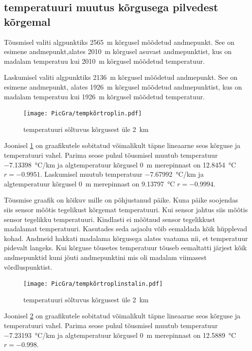 \documentclass{trkut}%
\begin{document}
\subsection{temperatuuri muutus kõrgusega pilvedest kõrgemal}
Tõusmisel valiti algpunktiks \SI{2565}{m} kõrgusel mõõdetud andmepunkt. See on esimene andmepunkt,alates \SI{2010}{m} kõrgusel asuvast andmepunktist, kus on madalam temperatuu kui \SI{2010}{m} kõrgusel mõõdetud temperatuur.

Laskumisel valiti algpunktiks \SI{2136}{m} kõrgusel mõõdetud andmepunkt. See on esimene andmepunkt, alates \SI{1926}{m} kõrgusel mõõdetud andmepunktist, kus on madalam temperatuu kui \SI{1926}{m} kõrgusel mõõdetud temperatuur.

\begin{figure}[h]
	\texttt{[image: PicGra/tempkõrtroplin.pdf]}
	\caption{temperatuuri sõltuvus kõrgusest üle \SI{2}{km}}
	\label{tempkõrtroplin}%
\end{figure}


Joonisel \ref{tempkõrtroplin} on graafikutele sobitatud võimalikult täpne lineaarne seos kõrguse ja temperatuuri vahel. Parima seose puhul tõusmisel muutub temperatuur \SI{-7.13398}{\degreeCelsius/km} ja algtemperatuur kõrgusel \SI{0}{m} merepinnast on \SI{12.8454}{\celsius} $r=-0.9951$. Laskumisel muutub temperatuur \SI{-7.67992}{\degreeCelsius/km} ja algtemperatuur kõrgusel \SI{0}{m} merepinnast on \SI{9.13797}{\celsius} $r=-0.9994$.

Tõusmise graafik on kõikuv mille on põhjustanud päike. Kuna päike soojendas siis sensor mõõtis tegelikust kõrgemat temperatuuri. Kui sensor jahtus siis mõõtis sensor tegelikku temperatuuri. Kindlasti ei mõõtnud sensor tegelikkust madalamat temperatuuri. Kasutades seda asjaolu võib eemaldada kõik hüpplevad kohad. Andmeid hakkati madalama kõrgusega alates vaatama nii, et temperatuur pidevalt langeks. Kui kõrguse tõusetes temperatuur tõuseb eemaltatti järjest kõik andmepunktid kuni jõuti andmepunktini mis oli madalam viimasest võrdluspunktist.

\begin{figure}[h]
	\texttt{[image: PicGra/tempkõrtroplinstalin.pdf]}
 	\caption{temperatuuri sõltuvus kõrgusest üle \SI{2}{km}}
 	\label{tempkõrtroplinstalin}%
\end{figure}

Joonisel \ref{tempkõrtroplinstalin} on graafikutele sobitatud võimalikult täpne lineaarne seos kõrguse ja temperatuuri vahel. Parima seose puhul tõusmisel muutub temperatuur \SI{-7.23193}{\degreeCelsius/km} ja algtemperatuur kõrgusel \SI{0}{m} merepinnast on \SI{12.5889}{\celsius} $r=-0.998$.
\end{document}
